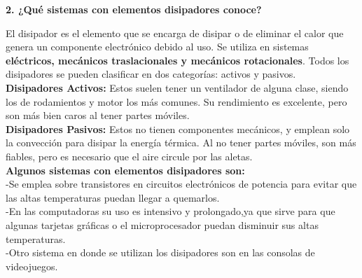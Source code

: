 \documentclass{article}
\begin{document}
	
\noindent\textbf{2. ¿Qué sistemas con elementos disipadores conoce?}

El disipador es el elemento que se encarga de disipar o de eliminar el calor que genera un componente electrónico debido al uso. Se utiliza en sistemas \textbf{eléctricos, mecánicos traslacionales y mecánicos rotacionales}. Todos los disipadores se pueden clasificar en dos categorías: activos y pasivos.\\
\textbf{Disipadores Activos:}
Estos suelen tener un ventilador de alguna clase, siendo los de rodamientos y motor los más comunes. Su rendimiento es excelente, pero son más bien caros al tener partes móviles.\\
\textbf{Disipadores Pasivos:}
Estos no tienen componentes mecánicos, y emplean solo la convección para disipar la energía térmica. Al no tener partes móviles, son más fiables, pero es necesario que el aire circule por las aletas.\\
\textbf{Algunos sistemas con elementos disipadores son:}\\
	-Se emplea sobre transistores en circuitos electrónicos de potencia para evitar que las altas temperaturas puedan llegar a 		    quemarlos.\\
	-En las computadoras su uso es intensivo y prolongado,ya que sirve para que algunas tarjetas gráficas o el microprocesador 			puedan disminuir sus altas temperaturas.\\
	-Otro sistema en donde se utilizan los disipadores son en las consolas de videojuegos.
\end{document}
